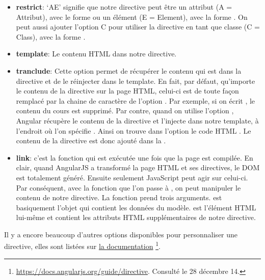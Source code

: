\documentclass[a4paper,10pt,twoside]{sphinxmanual}
\begin{document}
\begin{itemize}
\item {} 
\textbf{restrict}: `AE' signifie que notre directive peut être un attribut (A = Attribut), avec le forme  ou un élément (E = Element), avec la forme . On peut aussi ajouter l'option C pour utiliser la directive en tant que classe (C = Class), avec la forme .

\item {} 
\textbf{template}: Le contenu HTML dans notre directive.

\item {} 
\textbf{tranclude}: Cette option permet de récupérer le contenu qui est dans la directive et de le réinjecter dans le template. En fait, par défaut, qu'importe le contenu de la directive sur la page HTML, celui-ci est de toute façon remplacé par la chaine de caractère de l'option . Par exemple, si on écrit , le contenu du cours est supprimé. Par contre, quand on utilise l'option , Angular récupère le contenu de la directive et l'injecte dans notre template, à l'endroit où l'on spécifie . Ainsi on trouve dans l'option  le code HTML . Le contenu de la directive est donc ajouté dans la .

\item {} 
\textbf{link}: c'est la fonction qui est exécutée une fois que la page est compilée. En clair, quand AngularJS a transformé la page HTML et ses directives, le DOM est totalement généré. Ensuite seulement JavaScript peut agir sur celui-ci. Par conséquent, avec la fonction que l'on passe à , on peut manipuler le contenu de notre directive. La fonction prend trois arguments.  est basiquement l'objet qui contient les données du modèle.  est l'élément HTML lui-même et  contient les attributs HTML supplémentaires de notre directive.

\end{itemize}

Il y a encore beaucoup d'autres options disponibles pour personnaliser une directive, elles sont listées sur \href{https://docs.angularjs.org/guide/directive}{la documentation} \footnote{
\href{https://docs.angularjs.org/guide/directive}{https://docs.angularjs.org/guide/directive}. Consulté le 28 décembre 14.
}.
\end{document}
